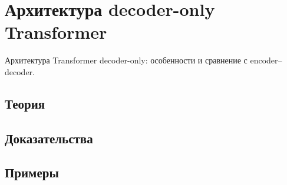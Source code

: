 
\section{Архитектура decoder-only Transformer}
\label{sec:2.5.05-decoder-only-transformer}

\begin{ticket}
Архитектура Transformer decoder-only: особенности и сравнение с encoder–decoder.
\end{ticket}

\subsection*{Теория}

\subsection*{Доказательства}

\subsection*{Примеры}
